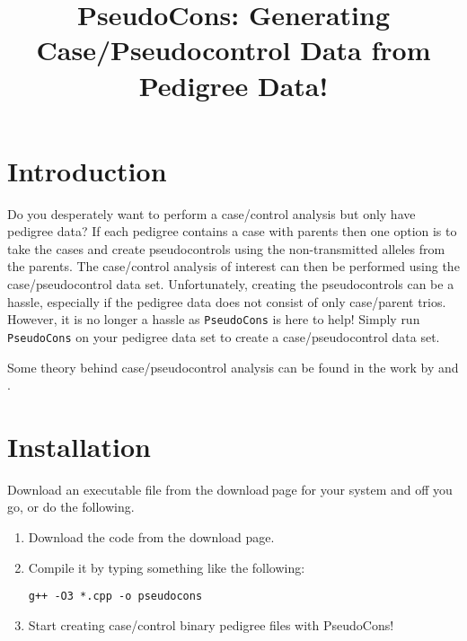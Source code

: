 \documentclass[a4paper,12pt]{article}
\newcommand{\code}[1]{{\footnotesize{{\tt #1}}}}
\begin{document}
\title{PseudoCons: Generating Case/Pseudocontrol Data from Pedigree Data!}
\date{}
\author{}
\maketitle
\newpage
\tableofcontents
\newpage
\section{Introduction}
\label{introduction}

Do you desperately want to perform a case/control analysis but only have pedigree data? If each pedigree contains a case with parents then one option is to take the cases and create pseudocontrols using the non-transmitted alleles from the parents. The case/control analysis of interest can then be performed using the case/pseudocontrol data set. Unfortunately, creating the pseudocontrols can be a hassle, especially if the pedigree data does not consist of only case/parent trios. However, it is no longer a hassle as \code{PseudoCons} is here to help! Simply run \code{PseudoCons} on your pedigree data set to create a case/pseudocontrol data set. 

Some theory behind case/pseudocontrol analysis can be found in the work by \citet{cordell:04} and \citet{cordell:etal:04}. 


\section{Installation}
\label{installation}

Download an executable file from the download$\:$page for your system and off you go, or do the following. 
\begin{enumerate}

\item Download the code from the download page. 
\item Compile it by typing something like the following: \begin{verbatim}g++ -O3 *.cpp -o pseudocons \end{verbatim}

\item Start creating case/control binary pedigree files with PseudoCons!\end{enumerate}

\end{document}
